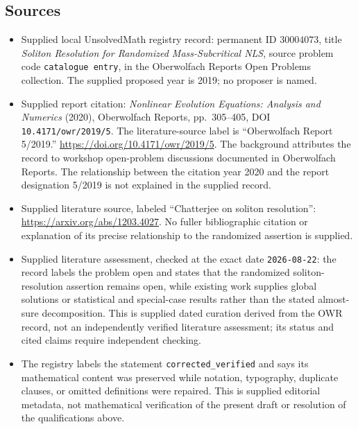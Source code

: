 \documentclass[11pt]{article}
\begin{document}
\subsection{Sources}
\begin{itemize}
\item Supplied local UnsolvedMath registry record: permanent ID \(30004073\), title \emph{Soliton Resolution for Randomized Mass-Subcritical NLS}, source problem code \texttt{catalogue entry}, in the Oberwolfach Reports Open Problems collection. The supplied proposed year is 2019; no proposer is named.
\item Supplied report citation: \emph{Nonlinear Evolution Equations: Analysis and Numerics} (2020), Oberwolfach Reports, pp.\ 305--405, DOI \texttt{10.4171/owr/2019/5}. The literature-source label is ``Oberwolfach Report 5/2019.'' \url{https://doi.org/10.4171/owr/2019/5}. The background attributes the record to workshop open-problem discussions documented in Oberwolfach Reports. The relationship between the citation year 2020 and the report designation 5/2019 is not explained in the supplied record.
\item Supplied literature source, labeled ``Chatterjee on soliton resolution'': \url{https://arxiv.org/abs/1203.4027}. No fuller bibliographic citation or explanation of its precise relationship to the randomized assertion is supplied.
\item Supplied literature assessment, checked at the exact date \texttt{2026-08-22}: the record labels the problem open and states that the randomized soliton-resolution assertion remains open, while existing work supplies global solutions or statistical and special-case results rather than the stated almost-sure decomposition. This is supplied dated curation derived from the OWR record, not an independently verified literature assessment; its status and cited claims require independent checking.
\item The registry labels the statement \texttt{corrected\_verified} and says its mathematical content was preserved while notation, typography, duplicate clauses, or omitted definitions were repaired. This is supplied editorial metadata, not mathematical verification of the present draft or resolution of the qualifications above.
\end{itemize}
\end{document}
